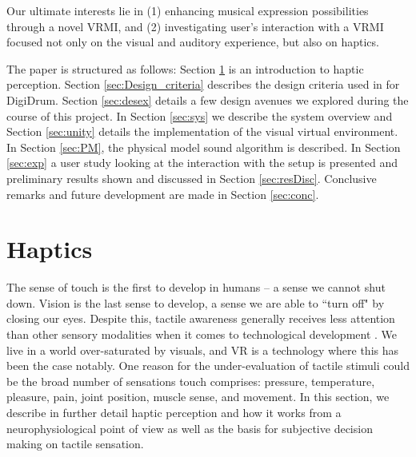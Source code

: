 \documentclass{article}
\begin{document}
Our ultimate interests lie in (1) enhancing musical expression possibilities through a novel VRMI, and (2) investigating user's interaction with a VRMI focused not only on the visual and auditory experience, but also on haptics.


The paper is structured as follows: 
Section \ref{sec:haptics} is an introduction to haptic perception. Section \ref{sec:Design_criteria} describes the design criteria used in for DigiDrum. Section \ref{sec:desex} details a few design avenues we explored during the course of this project. In Section \ref{sec:sys} we describe the system overview and Section \ref{sec:unity} details the implementation of the visual virtual environment. In Section \ref{sec:PM}, the physical model sound algorithm is described. 
In Section \ref{sec:exp} a user study looking at the interaction with the setup is presented and preliminary results shown and discussed in Section \ref{sec:resDisc}. Conclusive remarks and future development are made in Section \ref{sec:conc}.


\section{Haptics}\label{sec:haptics}
The sense of touch is the first to develop in humans -- a sense we cannot shut down. Vision is the last sense to develop, a sense we are able to ``turn off" \cite{Barnett1972} by closing our eyes. Despite this, tactile awareness generally receives less attention than other sensory modalities when it comes to technological development \cite{Gallace2012}. We live in a world over-saturated by visuals, and VR is a technology where this has been the case notably. One reason for the under-evaluation of tactile stimuli could be the broad number of sensations touch comprises: pressure, temperature, pleasure, pain, joint position, muscle sense, and movement. %
In this section, we describe in further detail haptic perception and how it works from a neurophysiological point of view as well as the basis for subjective decision making on tactile sensation.
\end{document}
